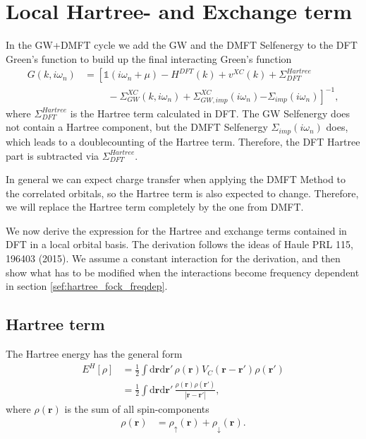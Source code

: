 \documentclass[12pt,a4paper]{scrartcl}
\numberwithin{equation}{section}
\newcommand{\unity}{\mathds{1}}
\renewcommand{\vec}{\mathbf}
\begin{document}
\section{Local Hartree- and Exchange term}
\label{sec:hartree_exchange}
In the GW+DMFT cycle we add the GW and the DMFT Selfenergy to the DFT Green's function
to build up the final interacting Green's function
\begin{align}
 G(k,i\omega_n) 
 &= \left[ \unity(i\omega_n+\mu ) -H^{DFT}(k) + v^{XC}(k) + \Sigma^{Hartree}_{DFT} \right.\nonumber\\
          & \hspace{1cm}- \Sigma^{XC}_{GW}(k,i\omega_n) 
          + \Sigma_{GW,imp}^{XC}(i\omega_n)
          \left. - \Sigma_{imp}(i\omega_n)
           \right]^{-1},
\end{align}
where $\Sigma_{DFT}^{Hartree}$ is the Hartree term calculated in DFT.
The GW Selfenergy does not contain a Hartree component, 
but the DMFT Selfenergy $\Sigma_{imp}(i\omega_n)$ does, which leads
to a doublecounting of the Hartree term. Therefore, the DFT Hartree part
is subtracted via $\Sigma_{DFT}^{Hartree}$.

In general we can expect charge transfer when applying the
DMFT Method to the correlated orbitals, so the Hartree term is also 
expected to change. 
Therefore, we will replace the Hartree term completely by the one from DMFT.

We now derive the expression for the Hartree and exchange terms
contained in DFT in a local orbital basis.
The derivation follows the ideas of Haule PRL 115, 196403 (2015).
We assume a constant interaction for the derivation, and then 
show what has to be modified when the interactions become
frequency dependent in section \ref{sef:hartree_fock_freqdep}.

\subsection{Hartree term}
The Hartree energy has the general form
\begin{align}
E^H[\rho]
%
&= \frac{1}{2}\int \mathrm{d}\vec{r}\mathrm{d}\vec{r}' \, 
\rho(\vec{r}) V_C(\vec{r}-\vec{r}') \rho(\vec{r}') \\
%
&= \frac{1}{2} \int \mathrm{d}\vec{r}\mathrm{d}\vec{r}' \,
\frac{\rho(\vec{r}) \rho(\vec{r}') }{|\vec{r}-\vec{r}'|},
\end{align}
where $\rho(\vec{r})$ is the sum of all spin-components
\begin{align}
\rho(\vec{r}) &= \rho_{\uparrow}(\vec{r}) + \rho_{\downarrow}(\vec{r}).
\end{align}
\end{document}
